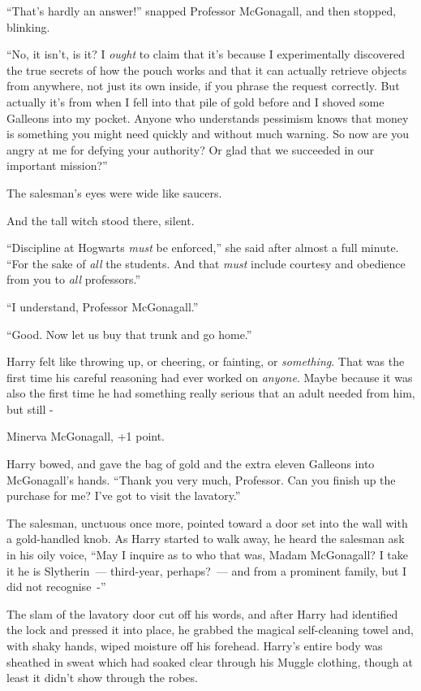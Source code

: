 ``That's hardly an answer!'' snapped Professor McGonagall, and then stopped, blinking.

``No, it isn't, is it? I \emph{ought} to claim that it's because I experimentally discovered the true secrets of how the pouch works and that it can actually retrieve objects from anywhere, not just its own inside, if you phrase the request correctly. But actually it's from when I fell into that pile of gold before and I shoved some Galleons into my pocket. Anyone who understands pessimism knows that money is something you might need quickly and without much warning. So now are you angry at me for defying your authority? Or glad that we succeeded in our important mission?''

The salesman's eyes were wide like saucers.

And the tall witch stood there, silent.

``Discipline at Hogwarts \emph{must} be enforced,'' she said after almost a full minute. ``For the sake of \emph{all} the students. And that \emph{must} include courtesy and obedience from you to \emph{all} professors.''

``I understand, Professor McGonagall.''

``Good. Now let us buy that trunk and go home.''

Harry felt like throwing up, or cheering, or fainting, or \emph{something}. That was the first time his careful reasoning had ever worked on \emph{anyone}. Maybe because it was also the first time he had something really serious that an adult needed from him, but still -

Minerva McGonagall, +1 point.

Harry bowed, and gave the bag of gold and the extra eleven Galleons into McGonagall's hands. ``Thank you very much, Professor. Can you finish up the purchase for me? I've got to visit the lavatory.''

The salesman, unctuous once more, pointed toward a door set into the wall with a gold-handled knob. As Harry started to walk away, he heard the salesman ask in his oily voice, ``May I inquire as to who that was, Madam McGonagall? I take it he is Slytherin~--- third-year, perhaps?~--- and from a prominent family, but I did not recognise~-''

The slam of the lavatory door cut off his words, and after Harry had identified the lock and pressed it into place, he grabbed the magical self-cleaning towel and, with shaky hands, wiped moisture off his forehead. Harry's entire body was sheathed in sweat which had soaked clear through his Muggle clothing, though at least it didn't show through the robes.

